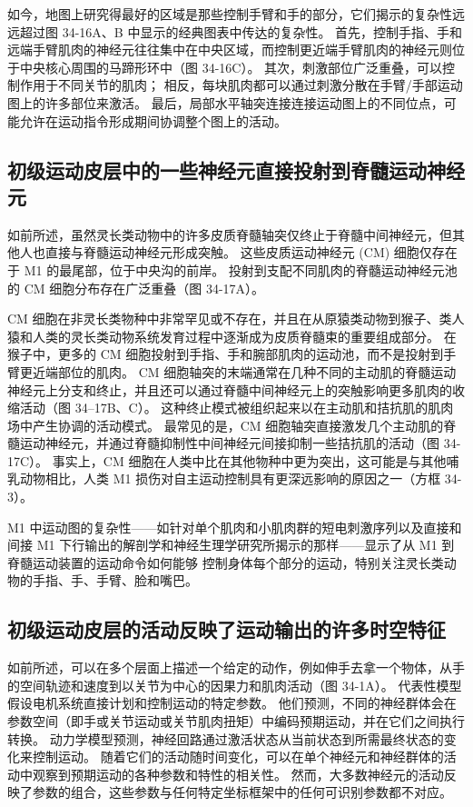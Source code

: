 如今，地图上研究得最好的区域是那些控制手臂和手的部分，它们揭示的复杂性远远超过图 34-16A、B 中显示的经典图表中传达的复杂性。 首先，控制手指、手和远端手臂肌肉的神经元往往集中在中央区域，而控制更近端手臂肌肉的神经元则位于中央核心周围的马蹄形环中（图 34-16C）。 其次，刺激部位广泛重叠，可以控制作用于不同关节的肌肉； 相反，每块肌肉都可以通过刺激分散在手臂/手部运动图上的许多部位来激活。 最后，局部水平轴突连接连接运动图上的不同位点，可能允许在运动指令形成期间协调整个图上的活动。


\subsection{初级运动皮层中的一些神经元直接投射到脊髓运动神经元}
如前所述，虽然灵长类动物中的许多皮质脊髓轴突仅终止于脊髓中间神经元，但其他人也直接与脊髓运动神经元形成突触。 这些皮质运动神经元 (CM) 细胞仅存在于 M1 的最尾部，位于中央沟的前岸。 投射到支配不同肌肉的脊髓运动神经元池的 CM 细胞分布存在广泛重叠（图 34-17A）。

CM 细胞在非灵长类物种中非常罕见或不存在，并且在从原猿类动物到猴子、类人猿和人类的灵长类动物系统发育过程中逐渐成为皮质脊髓束的重要组成部分。 在猴子中，更多的 CM 细胞投射到手指、手和腕部肌肉的运动池，而不是投射到手臂更近端部位的肌肉。 CM 细胞轴突的末端通常在几种不同的主动肌的脊髓运动神经元上分支和终止，并且还可以通过脊髓中间神经元上的突触影响更多肌肉的收缩活动（图 34–17B、C）。 这种终止模式被组织起来以在主动肌和拮抗肌的肌肉场中产生协调的活动模式。 最常见的是，CM 细胞轴突直接激发几个主动肌的脊髓运动神经元，并通过脊髓抑制性中间神经元间接抑制一些拮抗肌的活动（图 34-17C）。 事实上，CM 细胞在人类中比在其他物种中更为突出，这可能是与其他哺乳动物相比，人类 M1 损伤对自主运动控制具有更深远影响的原因之一（方框 34-3）。

M1 中运动图的复杂性——如针对单个肌肉和小肌肉群的短电刺激序列以及直接和间接 M1 下行输出的解剖学和神经生理学研究所揭示的那样——显示了从 M1 到脊髓运动装置的运动命令如何能够 控制身体每个部分的运动，特别关注灵长类动物的手指、手、手臂、脸和嘴巴。

\subsection{初级运动皮层的活动反映了运动输出的许多时空特征}
如前所述，可以在多个层面上描述一个给定的动作，例如伸手去拿一个物体，从手的空间轨迹和速度到以关节为中心的因果力和肌肉活动（图 34-1A）。 代表性模型假设电机系统直接计划和控制运动的特定参数。 他们预测，不同的神经群体会在参数空间（即手或关节运动或关节肌肉扭矩）中编码预期运动，并在它们之间执行转换。 动力学模型预测，神经回路通过激活状态从当前状态到所需最终状态的变化来控制运动。 随着它们的活动随时间变化，可以在单个神经元和神经群体的活动中观察到预期运动的各种参数和特性的相关性。 然而，大多数神经元的活动反映了参数的组合，这些参数与任何特定坐标框架中的任何可识别参数都不对应。

